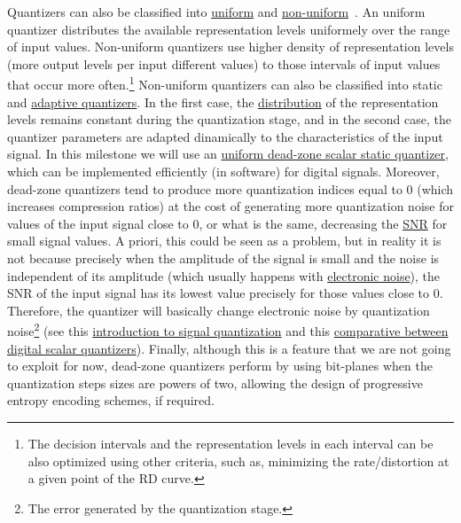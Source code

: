 Quantizers can also be classified into
\href{https://en.wikipedia.org/wiki/Quantization_(signal_processing)#Mid-riser_and_mid-tread_uniform_quantizers}{uniform}
and
\href{https://nptel.ac.in/content/storage2/courses/117104069/chapter_5/5_5.html}{non-uniform}~\cite{sayood2017introduction,vetterli2014foundations}. An
uniform quantizer distributes the available representation levels
uniformely over the range of input values. Non-uniform quantizers use
higher density of representation levels (more output levels per input
different values) to those intervals of input values that occur more
often.\footnote{The decision intervals and the representation levels
in each interval can be also optimized using other criteria, such as,
minimizing the rate/distortion at a given point of the RD curve.}
Non-uniform quantizers can also be classified into static and
\href{https://en.wikipedia.org/wiki/Adaptive_differential_pulse-code_modulation}{adaptive
  quantizers}. In the first case, the
\href{https://en.wikipedia.org/wiki/Probability_distribution}{distribution}
of the representation levels remains constant during the quantization
stage, and in the second case, the quantizer parameters are adapted
dinamically to the characteristics of the input signal. In this
milestone we will use an
\href{https://en.wikipedia.org/wiki/Quantization_(signal_processing)#Dead-zone_quantizers}{uniform
  dead-zone scalar static quantizer}, which can be implemented
efficiently (in software) for digital signals. Moreover, dead-zone
quantizers tend to produce more quantization indices equal to 0 (which
increases compression ratios) at the cost of generating more
quantization noise for values of the input signal close to 0, or what
is the same, decreasing the
\href{https://en.wikipedia.org/wiki/Signal-to-noise_ratio}{SNR} for
small signal values. A priori, this could be seen as a problem, but in
reality it is not because precisely when the amplitude of the signal
is small and the noise is independent of its amplitude (which usually
happens with
\href{https://en.wikipedia.org/wiki/Noise_(electronics)}{electronic
  noise}), the SNR of the input signal has its lowest value precisely
for those values close to 0. Therefore, the quantizer will basically change electronic noise by quantization
noise\footnote{The error generated by the quantization stage.} (see
this
\href{https://github.com/vicente-gonzalez-ruiz/signal_quantization}{introduction
  to signal quantization} and this
\href{https://github.com/vicente-gonzalez-ruiz/scalar_quantization}{comparative
  between digital scalar quantizers}). Finally, although this is a
feature that we are not going to exploit for now, dead-zone quantizers
perform by using bit-planes when the quantization steps sizes are powers of
two, allowing the design of progressive entropy encoding schemes, if
required.

